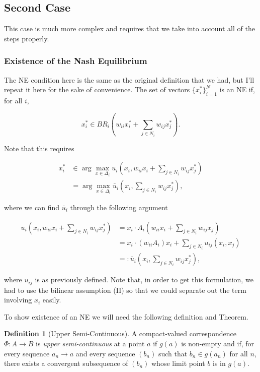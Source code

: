 \documentclass{article}
\theoremstyle{definition}
\newtheorem*{definition}{Definition}
\begin{document}
	\subsection*{Second Case}
	
	This case is much more complex and requires that we take into account all of the steps properly.
	
	\subsubsection*{Existence of the Nash Equilibrium}
	
	The NE condition here is the same as the original definition that we had, but I'll repeat it here for the sake of convenience. The set of vectors $\{ x_i^*\}_{i = 1}^N$ is an NE if, for all $i$,
	
	\begin{equation*}
		x_i^* \in BR_i( w_{ii} x_i^* + \sum_{j \in N_i} w_{ij} x_j^*).
	\end{equation*}
	
	Note that this requires
	
	\begin{align}
		x_i^* &\in \arg\max_{x \in \Delta_i} u_i(x_i, w_{ii} x_i + \sum_{j \in N_i} w_{ij} x_j^*) \nonumber\\
		&= \arg\max_{x \in \Delta_i} \bar{u}_i(x_i, \sum_{j \in N_i} w_{ij} x_j^*),
	\end{align}

	where we can find $\bar{u}_i$ through the following argument
	
	\begin{align}
		u_i(x_i, w_{ii} x_i + \sum_{j \in N_i} w_{ij} x_j^*) & = x_i \cdot A_i (w_{ii} x_i + \sum_{j \in N_i} w_{ij} x_j) \\
		 & = x_i \cdot (w_{ii} A_i)  x_i + \sum_{j \in N_i} u_{ij}(x_i, x_j) \\
		 & =: \bar{u}_i(x_i, \sum_{j \in N_i} w_{ij} x_j^*), \nonumber
	\end{align}
	
	where $u_{ij}$ is as previously defined. Note that, in order to get this formulation, we had to use the bilinear assumption (II) so that we could separate out the term involving $x_i$ easily. 
	
	To show existence of an NE we will need the following definition and Theorem.

	\begin{definition}[Upper Semi-Continuous]
		A compact-valued correspondence $\Phi: A \rightarrow B$ is \emph{upper semi-continuous} at a point $a$ if $g(a)$ is non-empty and if, for every sequence $a_n \rightarrow a$ and every sequence $(b_n)$ such that $b_n \in g(a_n)$ for all $n$, there exists a convergent subsequence of $(b_n)$ whose limit point $b$ is in $g(a)$.  
	\end{definition}
\end{document}
